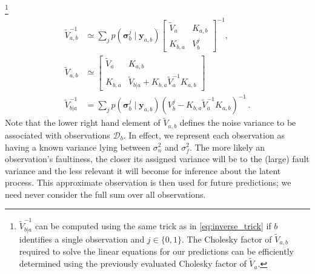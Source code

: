 \documentclass[twoside]{article}
\newcommand{\deq}{=}
\newcommand{\given}{\!\ensuremath{\mid}\!}
\newcommand{\cm}[1]{\ensuremath{\mathcal{#1}}}
\newcommand{\bm}[1]{\ensuremath{\mathbf{#1}}}
\newcommand{\data}{\ensuremath{\cm{D}}}
\newcommand{\vect}[1]{\bm{#1}}
\newcommand{\vy}{\vect{y}}
\newcommand{\vs}{\vect{\sigma}}
\newcommand{\fPr}{p}
\newcommand{\Prob}[2]{\fPr(#1 \given #2 )}
\begin{document}
\footnote{
$\tilde{V}^{-1}_{b|a}$ can be computed using the same trick as in \eqref{eq:inverse_trick} if
$b$ identifies a single observation and $j\in\{0,1\}$. The Cholesky factor of $\tilde{V}_{a,b}$ required to solve the linear equations for our predictions can be efficiently determined \citep[Appendix
  B]{osbornebayesian} using the previously evaluated Cholesky factor of $\tilde{V}_{a}$.
}
\begin{align*}
\tilde{V}^{-1}_{a,b} &\simeq \sum_j \Prob{\vs^j_{b}}{\vy_{a,b}} \begin{bmatrix}
 \tilde{V}_a & K_{a,b}
\\
 K_{b,a} & V^j_b
\end{bmatrix}^{-1},
\nonumber\\
\tilde{V}_{a,b} & \simeq
\begin{bmatrix}
 \tilde{V}_a & K_{a,b}\\
 K_{b,a} & \tilde{V}_{b|a} + K_{b,a} \tilde{V}_a^{-1} K_{a,b}
\end{bmatrix}\\
% 
 \tilde{V}^{-1}_{b|a} & \deq \sum_j \Prob{\vs^j_{b}}{\vy_{a,b}} (V^j_b -K_{b,a} \tilde{V}_a^{-1}K_{a,b})^{-1}\,.
\end{align*}
 Note that the
lower right hand element of $\tilde{V}_{a,b}$ defines the noise
variance to be associated with observations $\data_b$. In effect, we represent
each observation as having a known variance lying between
$\sigma_n^2$ and $\sigma_f^2$. The more likely an observation's
faultiness, the closer its assigned variance will be to the (large)
fault variance and the less relevant it will become for inference
about the latent process. This approximate observation is then used
for future predictions; we need never consider the full sum over all
observations. 
\end{document}
